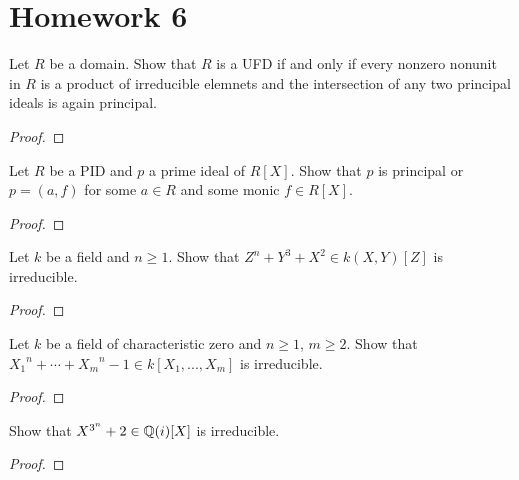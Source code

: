 \chapter{Homework 6}
\begin{problem}
Let $R$ be a domain. Show that $R$ is a UFD if and only if every nonzero
nonunit in $R$ is a product of irreducible elemnets and the intersection of
any two principal ideals is again principal.
\end{problem}
\begin{proof}
\end{proof}

\begin{problem}
Let $R$ be a PID and $p$ a prime ideal of $R[X]$. Show that $p$ is
principal or $p=(a,f)$ for some $a\in R$ and some monic $f\in R[X]$.
\end{problem}
\begin{proof}
\end{proof}

\begin{problem}
Let $k$ be a field and $n\geq 1$. Show that $Z^n+Y^3+X^2\in k(X,Y)[Z]$ is
irreducible.
\end{problem}
\begin{proof}
\end{proof}

\begin{problem}
Let $k$ be a field of characteristic zero and $n\geq 1$, $m\geq 2$. Show
that ${X_1}^n+\cdots+{X_m}^n-1\in k[X_1,...,X_m]$ is irreducible.
\end{problem}
\begin{proof}
\end{proof}

\begin{problem}
Show that $X^{3^n}+2\in\mathbb{Q}(i)[X]$ is irreducible.
\end{problem}
\begin{proof}
\end{proof}

